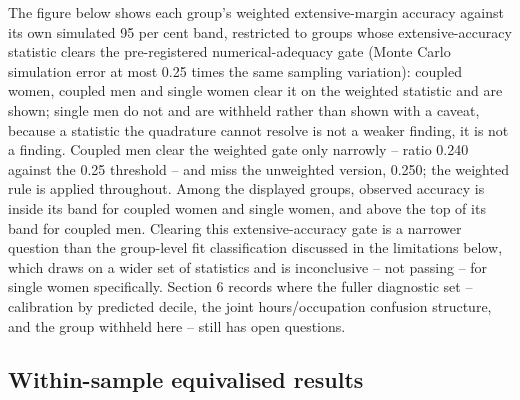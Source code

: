 \documentclass[11pt,a4paper]{article}
\begin{document}
The figure below shows each group's weighted extensive-margin accuracy against its own simulated 95 per cent band, restricted to groups whose extensive-accuracy statistic clears the pre-registered numerical-adequacy gate (Monte Carlo simulation error at most 0.25 times the same sampling variation): coupled women, coupled men and single women clear it on the weighted statistic and are shown; single men do not and are withheld rather than shown with a caveat, because a statistic the quadrature cannot resolve is not a weaker finding, it is not a finding. Coupled men clear the weighted gate only narrowly -- ratio 0.240 against the 0.25 threshold -- and miss the unweighted version, 0.250; the weighted rule is applied throughout. Among the displayed groups, observed accuracy is inside its band for coupled women and single women, and above the top of its band for coupled men. Clearing this extensive-accuracy gate is a narrower question than the group-level fit classification discussed in the limitations below, which draws on a wider set of statistics and is inconclusive -- not passing -- for single women specifically. Section 6 records where the fuller diagnostic set -- calibration by predicted decile, the joint hours/occupation confusion structure, and the group withheld here -- still has open questions.

\subsection{Within-sample equivalised results}\label{within-sample-equivalised-results}
\end{document}

